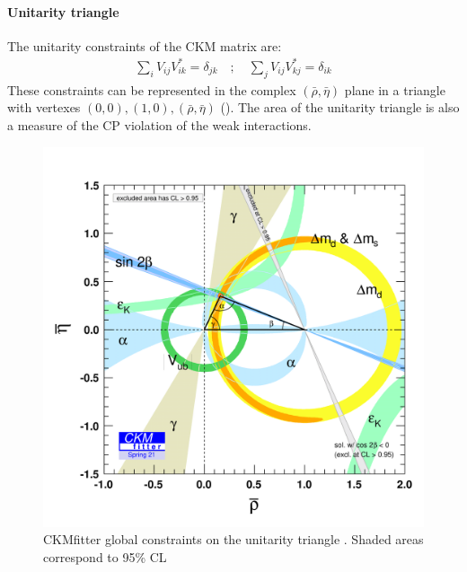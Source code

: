 \paragraph*{Unitarity triangle}
The unitarity constraints of the CKM matrix are:
\begin{gather}
    \sum_i V_{ij}V_{ik}^*=\delta_{jk} \quad ; \quad 
    \sum_j V_{ij}V_{kj}^*=\delta_{ik}
\end{gather}
These constraints can be represented in the complex $(\bar{\rho},\bar{\eta})$ plane in a triangle with vertexes $(0,0), (1,0), (\bar{\rho},\bar{\eta})$ (). The area of the unitarity triangle is also a measure of the CP violation of the weak interactions.
\begin{figure}[h!]
    \centering
    \includegraphics[width=0.69\linewidth]{fig//chap02-theory/triangle.png}
    \caption{CKMfitter global constraints on the unitarity triangle \cite{CKMfitter}. Shaded areas correspond to 95\% CL}
    \label{fig:triangle}
\end{figure}

